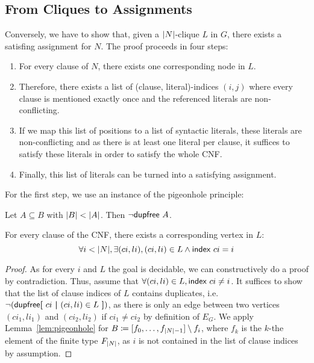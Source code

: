 \subsection{From Cliques to Assignments}
Conversely, we have to show that, given a $|N|$-clique $L$ in $G$, there exists a satisfing assignment for $N$. The proof proceeds in four steps:
\begin{enumerate}
  \item For every clause of $N$, there exists one corresponding node in $L$.
  \item Therefore, there exists a list of (clause, literal)-indices $(i, j)$ where every clause is mentioned exactly once and the referenced literals are non-conflicting. 
  \item If we map this list of positions to a list of syntactic literals, these literals are non-conflicting and as there is at least one literal per clause, it suffices to satisfy these literals in order to satisfy the whole CNF.
  \item Finally, this list of literals can be turned into a satisfying assignment.
\end{enumerate}

For the first step, we use an instance of the pigeonhole principle: 
\begin{lemma}\label{lem:pigeonhole}
  Let $A \subseteq B$ with $|B| < |A|$. Then $\lnot \textsf{dupfree}~A$. 
\end{lemma}

\begin{lemma}
  For every clause of the CNF, there exists a corresponding vertex in $L$:
  \[\forall i < |N|, \exists (ci, li), (ci, li) \in L \land \textsf{index}~ci = i \]
\end{lemma}
\begin{proof}
  As for every $i$ and $L$ the goal is decidable, we can constructively do a proof by contradiction. Thus, assume that $\forall (ci, li) \in L, \textsf{index}~ci \neq i$. It suffices to show that the list of clause indices of $L$ contains duplicates, i.e. $\lnot (\textsf{dupfree} \textbf{[}~ ci ~\textbf{|}~ (ci, li) \in L ~\textbf{]})$, as there is only an edge between two vertices $(ci_1, li_1)$ and $(ci_2, li_2)$ if $ci_1 \neq ci_2$ by definition of $E_G$. 
  We apply Lemma~\ref{lem:pigeonhole} for $B \coloneqq [f_0, \ldots, f_{|N| -1}] \setminus f_i$, where $f_k$ is the $k$-the element of the finite type $F_{|N|}$, as $i$ is not contained in the list of clause indices by assumption. 
\end{proof}

